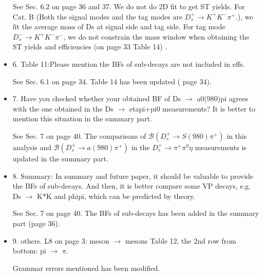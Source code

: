 \documentclass[a4paper]{article}
\begin{document}
\begin{itemize}
          {\color{blue} 
              See Sec. 6.2 on page 36 and 37.
              We do not do 2D fit to get ST yields.
              For Cat. B (Both the signal modes and the tag modes are $D_{s}^{+} \rightarrow K^{+}K^{-}\pi^{+}$.), we fit the average mass of Ds at signal side and tag side. 
              For tag mode $D_{s}^{-} \rightarrow K^{+}K^{-}\pi^{-}$, we do not constrain the mass window when obtaining the ST yields and efficiencies (on page 33 Table 14) .
          }

      \item 6. Table 11:Please mention the BFs of sub-decays are not included in effs.

          {\color{blue}See Sec. 6.1 on page 34. 
              Table 14 has been updated ( page 34).
          }

      \item 7. Have you checked whether your obtained BF of Ds $\rightarrow$ a0(980)pi agrees with the one obtained in the Ds $\rightarrow$ etapi+pi0 measurements?
            It is better to mention this situation in the summary part.

            {\color{blue} See Sec. 7 on page 40. 
                The comparisons of $\mathcal{B}(D_{s}^{+} \rightarrow S(980)\pi^{+})$ in this analysis and $\mathcal{B}(D_{s}^{+} \rightarrow a(980)\pi^{+})$ in the $D_{s}^{+} \rightarrow \pi^{+}\pi^{0}\eta$ measurements is updated in the summary part.
            }

    \item 8. Summary: In summary and future paper, it should be valuable to provide the BFs of sub-decays. 
        And then, it is better compare some VP decays, e.g. Ds $\rightarrow$ K*K and phipi, which can be predicted by theory.
        
        {\color{blue} See Sec. 7 on page 40.
            The BFs of sub-decays has been added in the summary part (page 36).
        }

    \item 9.  others. L8 on page 3: meson $\rightarrow$ mesons Table 12, the 2nd row from bottom: pi $\rightarrow$ $\pi$. 

        {\color{blue} Grammar errors mentioned has been modified.}
\end{itemize}
\end{document}
